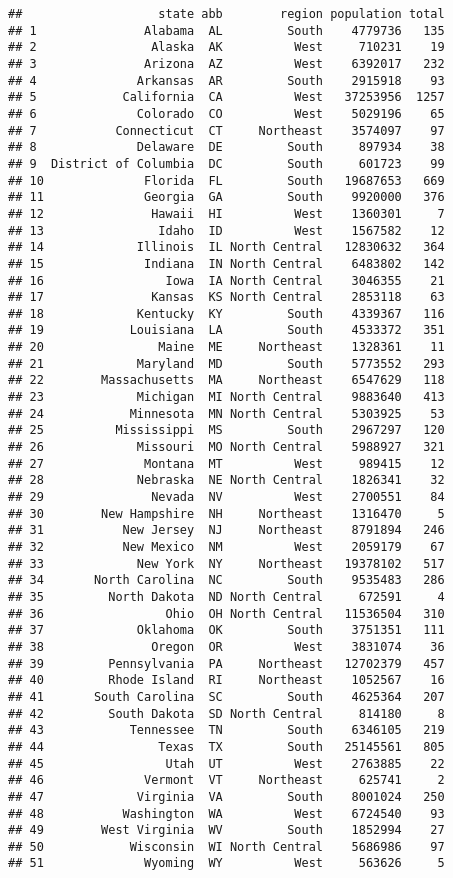 \documentclass[
]{article}
\begin{document}
\begin{verbatim}
##                   state abb        region population total
## 1               Alabama  AL         South    4779736   135
## 2                Alaska  AK          West     710231    19
## 3               Arizona  AZ          West    6392017   232
## 4              Arkansas  AR         South    2915918    93
## 5            California  CA          West   37253956  1257
## 6              Colorado  CO          West    5029196    65
## 7           Connecticut  CT     Northeast    3574097    97
## 8              Delaware  DE         South     897934    38
## 9  District of Columbia  DC         South     601723    99
## 10              Florida  FL         South   19687653   669
## 11              Georgia  GA         South    9920000   376
## 12               Hawaii  HI          West    1360301     7
## 13                Idaho  ID          West    1567582    12
## 14             Illinois  IL North Central   12830632   364
## 15              Indiana  IN North Central    6483802   142
## 16                 Iowa  IA North Central    3046355    21
## 17               Kansas  KS North Central    2853118    63
## 18             Kentucky  KY         South    4339367   116
## 19            Louisiana  LA         South    4533372   351
## 20                Maine  ME     Northeast    1328361    11
## 21             Maryland  MD         South    5773552   293
## 22        Massachusetts  MA     Northeast    6547629   118
## 23             Michigan  MI North Central    9883640   413
## 24            Minnesota  MN North Central    5303925    53
## 25          Mississippi  MS         South    2967297   120
## 26             Missouri  MO North Central    5988927   321
## 27              Montana  MT          West     989415    12
## 28             Nebraska  NE North Central    1826341    32
## 29               Nevada  NV          West    2700551    84
## 30        New Hampshire  NH     Northeast    1316470     5
## 31           New Jersey  NJ     Northeast    8791894   246
## 32           New Mexico  NM          West    2059179    67
## 33             New York  NY     Northeast   19378102   517
## 34       North Carolina  NC         South    9535483   286
## 35         North Dakota  ND North Central     672591     4
## 36                 Ohio  OH North Central   11536504   310
## 37             Oklahoma  OK         South    3751351   111
## 38               Oregon  OR          West    3831074    36
## 39         Pennsylvania  PA     Northeast   12702379   457
## 40         Rhode Island  RI     Northeast    1052567    16
## 41       South Carolina  SC         South    4625364   207
## 42         South Dakota  SD North Central     814180     8
## 43            Tennessee  TN         South    6346105   219
## 44                Texas  TX         South   25145561   805
## 45                 Utah  UT          West    2763885    22
## 46              Vermont  VT     Northeast     625741     2
## 47             Virginia  VA         South    8001024   250
## 48           Washington  WA          West    6724540    93
## 49        West Virginia  WV         South    1852994    27
## 50            Wisconsin  WI North Central    5686986    97
## 51              Wyoming  WY          West     563626     5
\end{verbatim}
\end{document}
